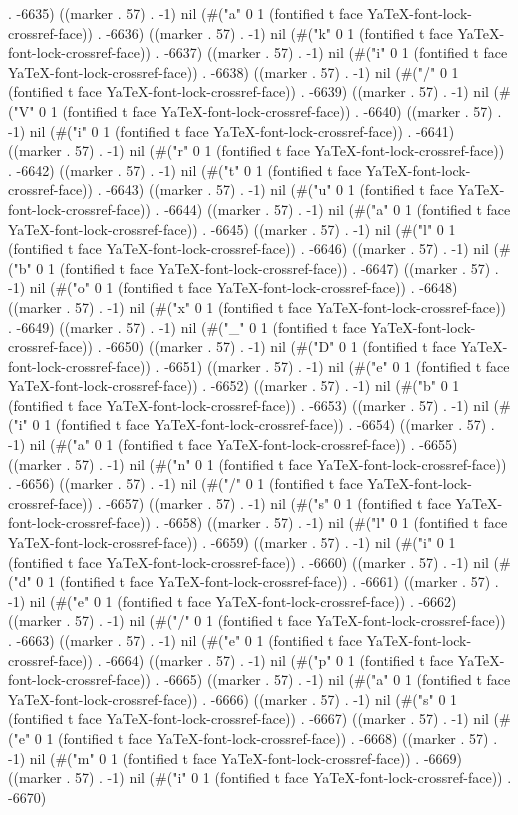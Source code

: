 . -6635) ((marker . 57) . -1) nil (#("a" 0 1 (fontified t face YaTeX-font-lock-crossref-face)) . -6636) ((marker . 57) . -1) nil (#("k" 0 1 (fontified t face YaTeX-font-lock-crossref-face)) . -6637) ((marker . 57) . -1) nil (#("i" 0 1 (fontified t face YaTeX-font-lock-crossref-face)) . -6638) ((marker . 57) . -1) nil (#("/" 0 1 (fontified t face YaTeX-font-lock-crossref-face)) . -6639) ((marker . 57) . -1) nil (#("V" 0 1 (fontified t face YaTeX-font-lock-crossref-face)) . -6640) ((marker . 57) . -1) nil (#("i" 0 1 (fontified t face YaTeX-font-lock-crossref-face)) . -6641) ((marker . 57) . -1) nil (#("r" 0 1 (fontified t face YaTeX-font-lock-crossref-face)) . -6642) ((marker . 57) . -1) nil (#("t" 0 1 (fontified t face YaTeX-font-lock-crossref-face)) . -6643) ((marker . 57) . -1) nil (#("u" 0 1 (fontified t face YaTeX-font-lock-crossref-face)) . -6644) ((marker . 57) . -1) nil (#("a" 0 1 (fontified t face YaTeX-font-lock-crossref-face)) . -6645) ((marker . 57) . -1) nil (#("l" 0 1 (fontified t face YaTeX-font-lock-crossref-face)) . -6646) ((marker . 57) . -1) nil (#("b" 0 1 (fontified t face YaTeX-font-lock-crossref-face)) . -6647) ((marker . 57) . -1) nil (#("o" 0 1 (fontified t face YaTeX-font-lock-crossref-face)) . -6648) ((marker . 57) . -1) nil (#("x" 0 1 (fontified t face YaTeX-font-lock-crossref-face)) . -6649) ((marker . 57) . -1) nil (#("_" 0 1 (fontified t face YaTeX-font-lock-crossref-face)) . -6650) ((marker . 57) . -1) nil (#("D" 0 1 (fontified t face YaTeX-font-lock-crossref-face)) . -6651) ((marker . 57) . -1) nil (#("e" 0 1 (fontified t face YaTeX-font-lock-crossref-face)) . -6652) ((marker . 57) . -1) nil (#("b" 0 1 (fontified t face YaTeX-font-lock-crossref-face)) . -6653) ((marker . 57) . -1) nil (#("i" 0 1 (fontified t face YaTeX-font-lock-crossref-face)) . -6654) ((marker . 57) . -1) nil (#("a" 0 1 (fontified t face YaTeX-font-lock-crossref-face)) . -6655) ((marker . 57) . -1) nil (#("n" 0 1 (fontified t face YaTeX-font-lock-crossref-face)) . -6656) ((marker . 57) . -1) nil (#("/" 0 1 (fontified t face YaTeX-font-lock-crossref-face)) . -6657) ((marker . 57) . -1) nil (#("s" 0 1 (fontified t face YaTeX-font-lock-crossref-face)) . -6658) ((marker . 57) . -1) nil (#("l" 0 1 (fontified t face YaTeX-font-lock-crossref-face)) . -6659) ((marker . 57) . -1) nil (#("i" 0 1 (fontified t face YaTeX-font-lock-crossref-face)) . -6660) ((marker . 57) . -1) nil (#("d" 0 1 (fontified t face YaTeX-font-lock-crossref-face)) . -6661) ((marker . 57) . -1) nil (#("e" 0 1 (fontified t face YaTeX-font-lock-crossref-face)) . -6662) ((marker . 57) . -1) nil (#("/" 0 1 (fontified t face YaTeX-font-lock-crossref-face)) . -6663) ((marker . 57) . -1) nil (#("e" 0 1 (fontified t face YaTeX-font-lock-crossref-face)) . -6664) ((marker . 57) . -1) nil (#("p" 0 1 (fontified t face YaTeX-font-lock-crossref-face)) . -6665) ((marker . 57) . -1) nil (#("a" 0 1 (fontified t face YaTeX-font-lock-crossref-face)) . -6666) ((marker . 57) . -1) nil (#("s" 0 1 (fontified t face YaTeX-font-lock-crossref-face)) . -6667) ((marker . 57) . -1) nil (#("e" 0 1 (fontified t face YaTeX-font-lock-crossref-face)) . -6668) ((marker . 57) . -1) nil (#("m" 0 1 (fontified t face YaTeX-font-lock-crossref-face)) . -6669) ((marker . 57) . -1) nil (#("i" 0 1 (fontified t face YaTeX-font-lock-crossref-face)) . -6670) 